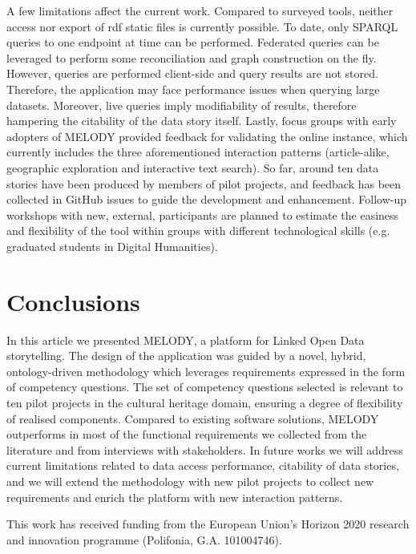 \documentclass[manuscript]
{acmart}
\begin{document}
A few limitations affect the current work. Compared to surveyed tools, neither access nor export of rdf static files is currently possible. To date, only SPARQL queries to one endpoint at time can be performed. Federated queries can be leveraged to perform some reconciliation and graph construction on the fly. However, queries are performed client-side and query results are not stored. Therefore, the application may face performance issues when querying large datasets. Moreover, live queries imply modifiability of results, therefore hampering the citability of the data story itself. Lastly, focus groups with early adopters of MELODY provided feedback for validating the online instance, which currently includes the three aforementioned interaction patterns (article-alike, geographic exploration and interactive text search). So far, around ten data stories have been produced by members of pilot projects, and feedback has been collected in GitHub issues to guide the development and enhancement. Follow-up workshops with new, external, participants are planned to estimate the easiness and flexibility of the tool within groups with different technological skills (e.g. graduated students in Digital Humanities).

\section{Conclusions} \label{conclusion}
In this article we presented MELODY, a platform for Linked Open Data storytelling. The design of the application was guided by a novel, hybrid, ontology-driven methodology which leverages requirements expressed in the form of competency questions. The set of competency questions selected is relevant to ten pilot projects in the cultural heritage domain, ensuring a degree of flexibility of realised components. Compared to existing software solutions, MELODY outperforms in most of the functional requirements we collected from the literature and from interviews with stakeholders. 
In future works we will address current limitations related to data access performance, citability of data stories, and we will extend the methodology with new pilot projects to collect new requirements and enrich the platform with new interaction patterns.

\begin{acks}
This work has received funding from the European Union’s Horizon 2020 research and innovation programme (Polifonia, G.A. 101004746).
\end{acks}



\end{document}
